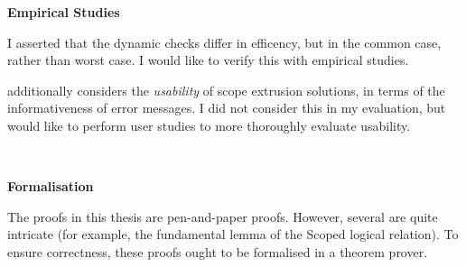 \noindent\begin{minipage}[t]{0.25\textwidth}
  \textbf{\textsf{Empirical Studies}}
\end{minipage}%
\begin{minipage}[t]{0.75\textwidth}
  I asserted that the dynamic checks differ in efficency, but in the common case, rather than worst case. I would like to verify this with empirical studies.
  \vspace{2mm}

  \citet{kiselyov-14} additionally considers the \textit{usability} of scope extrusion solutions, in terms of the informativeness of error messages. I did not consider this in my evaluation, but would like to perform user studies to more thoroughly evaluate usability.
  \vspace{4mm}
\end{minipage}\\

\noindent\begin{minipage}[t]{0.25\textwidth}
  \textbf{\textsf{Formalisation}}
\end{minipage}%
\begin{minipage}[t]{0.75\textwidth}
  The proofs in this thesis are pen-and-paper proofs. However, several are quite intricate (for example, the fundamental lemma of the \textsf{Scoped} logical relation). To ensure correctness, these proofs ought to be formalised in a theorem prover.
\end{minipage}







